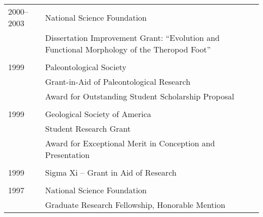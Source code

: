 \begin{longtable}{@{}lX@{}}
    \\
    2000--2003 & National Science Foundation\\
    & Dissertation Improvement Grant: ``Evolution and Functional Morphology of the Theropod Foot''\\
    \\
    1999 & Paleontological Society\\
    & Grant-in-Aid of Paleontological Research\\
    & Award for Outstanding Student Scholarship Proposal\\
    \\
    1999 & Geological Society of America\\
    & Student Research Grant\\
    & Award for Exceptional Merit in Conception and Presentation\\
    \\
    1999 & Sigma Xi -- Grant in Aid of Research\\
    \\
    1997 & National Science Foundation\\
    & Graduate Research Fellowship, Honorable Mention\\
\end{longtable}
